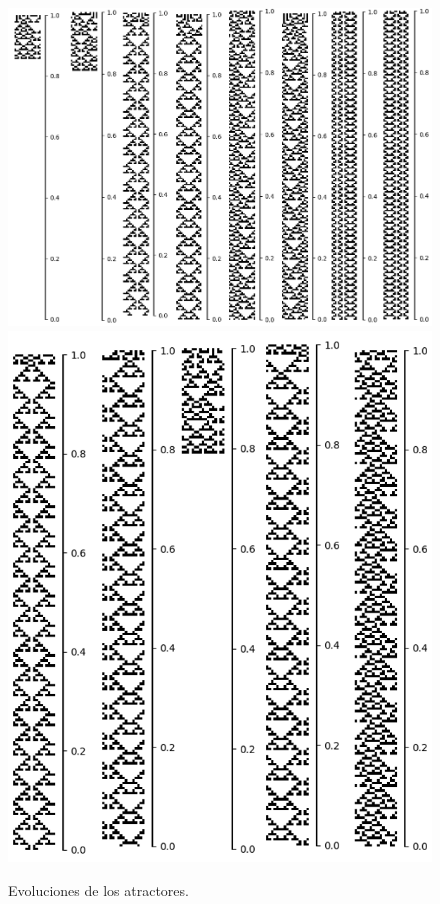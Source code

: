 \documentclass[11pt]{article}
\begin{document}
			\begin{figure}[H]
			\centering
			\includegraphics[scale=0.3]{resources/Atractores22/atractor_22_size_17_res.png}
			\includegraphics[scale=0.3]{resources/Atractores22/atractor_22_size_17_res1.png}
			\caption{Evoluciones de los atractores.}\label{fig:picture}
			\end{figure}
\end{document}
